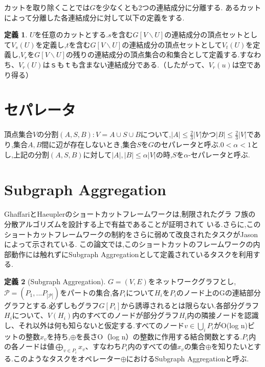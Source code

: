 \documentclass{thesis}
\theoremstyle{definition}
\newtheorem{definition}{定義}
\begin{document}
カットを取り除くことでは$G$を少なくとも2つの連結成分に分離する.
あるカットによって分離した各連結成分に対して以下の定義をする.

\begin{definition}
    $U$を任意のカットとする.$s$を含む$G[V\backslash U]$の連結成分の頂点セットとして$V_s(U)$を定義し,$t$を含む$G [V\backslash U]$の連結成分の頂点セットとして$V_t(U)$を定義し,$V_r$を$G [V \backslash U]$の残りの連結成分の頂点集合の和集合として定義する.すなわち、$V_r(U)$は$ｓ$も$ｔ$も含まない連結成分である.（したがって、$V_r(u)$は空であり得る）
\end{definition}

\section{セパレータ}
頂点集合$V$の分割$(A,S,B):V=A \cup S \cup B$について,$|A|\leq \frac{2}{3}|V|$かつ$|B|\leq \frac{2}{3}|V|$であり,集合$A,B$間に辺が存在しないとき,集合$S$を$G$のセパレータと呼ぶ.$0 <\alpha < 1$とし,上記の分割$(A,S,B)$に対して$|A|,|B|\leq \alpha|V|$の時,$S$を$\alpha$-セパレータと呼ぶ.\par


\section{Subgraph Aggregation}
GhaffariとHaeuplerのショートカットフレームワークは,制限されたグラ
フ族の分散アルゴリズムを設計する上で有益であることが証明されて
いる.さらに,このショートカットフレームワークの制約をさらに弱めて改良されたタスクがJasonによって示されている.
この論文では,このショートカットのフレームワークの内部動作には触れずにSubgraph Aggregationとして定義されているタスクを利用する.

\begin{definition}[Subgraph Aggregation]
    $G=(V,E)$をネットワークグラフとし,$\mathcal{P} =(P_1,...P_{|\mathcal{P}|})$をパートの集合,各$P_i$について$H_i$を$P_i$のノード上のGの連結部分グラフとする.必ずしもグラフ$G[P_i]$から誘導されるとは限らない.各部分グラフ$H_i$について、$V(H_i)$内のすべてのノードが部分グラフ$H_i$内の隣接ノードを認識し、それ以外は何も知らないと仮定する.すべてのノード$v\in \bigcup_iP_i$がO(log n)ビットの整数$x_v$を持ち,$\oplus$を長さO（log n）の整数に作用する結合関数とする.$P_i$内の各ノードは値$\bigoplus_{v\in P_i}x_v$、すなわち$P_i$内のすべての値$x_v$の集合$\oplus$を知りたいとする.このようなタスクをオペレーター$\oplus$におけるSubgraph Aggregationと呼ぶ.
\end{definition}
\end{document}
